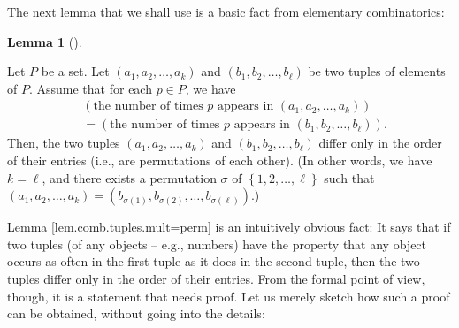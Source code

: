 \documentclass[numbers=enddot,12pt,final,onecolumn,notitlepage]{scrartcl}%
\numberwithin{exer}{subsection}
\theoremstyle{definition}
\newtheorem{lem}[theo]{Lemma}
\newenvironment{lemma}[1][]
{\begin{lem}[#1]\begin{leftbar}}
{\end{leftbar}\end{lem}}
\begin{document}
The next lemma that we shall use is a basic fact from elementary combinatorics:

\begin{lemma}
\label{lem.comb.tuples.mult=perm}Let $P$ be a set. Let $\left(  a_{1}%
,a_{2},\ldots,a_{k}\right)  $ and $\left(  b_{1},b_{2},\ldots,b_{\ell}\right)
$ be two tuples of elements of $P$. Assume that for each $p\in P$, we have%
\begin{align}
&  \left(  \text{the number of times }p\text{ appears in }\left(  a_{1}%
,a_{2},\ldots,a_{k}\right)  \right) \nonumber\\
&  =\left(  \text{the number of times }p\text{ appears in }\left(  b_{1}%
,b_{2},\ldots,b_{\ell}\right)  \right)  .
\label{eq.lem.comb.tuples.mult=perm.ass}%
\end{align}
Then, the two tuples $\left(  a_{1},a_{2},\ldots,a_{k}\right)  $ and $\left(
b_{1},b_{2},\ldots,b_{\ell}\right)  $ differ only in the order of their
entries (i.e., are permutations of each other). (In other words, we have
$k=\ell$, and there exists a permutation $\sigma$ of $\left\{  1,2,\ldots
,\ell\right\}  $ such that $\left(  a_{1},a_{2},\ldots,a_{k}\right)  =\left(
b_{\sigma\left(  1\right)  },b_{\sigma\left(  2\right)  },\ldots
,b_{\sigma\left(  \ell\right)  }\right)  $.)
\end{lemma}

Lemma \ref{lem.comb.tuples.mult=perm} is an intuitively obvious fact: It says
that if two tuples (of any objects -- e.g., numbers) have the property that
any object occurs as often in the first tuple as it does in the second tuple,
then the two tuples differ only in the order of their entries. From the formal
point of view, though, it is a statement that needs proof. Let us merely
sketch how such a proof can be obtained, without going into the details:
\end{document}

